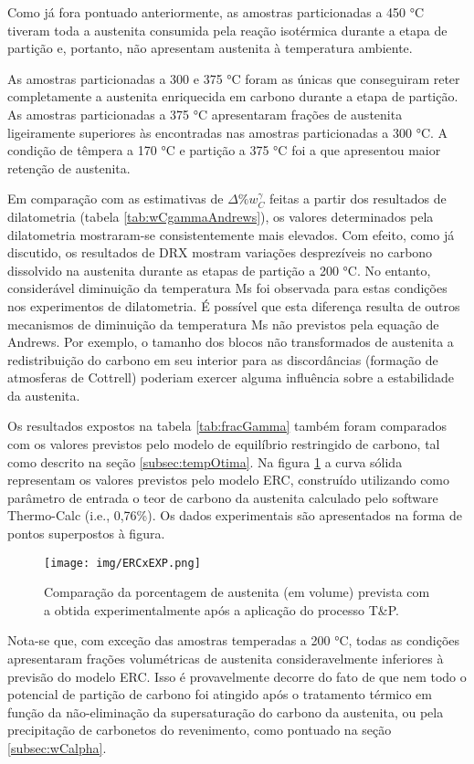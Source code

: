 Como já fora pontuado anteriormente, as amostras particionadas a 450 °C tiveram toda a austenita consumida pela reação isotérmica durante a etapa de partição e, portanto, não apresentam austenita à temperatura ambiente.

As amostras particionadas a 300 e 375 °C foram as únicas que conseguiram reter completamente a austenita enriquecida em carbono durante a etapa de partição. As amostras particionadas a 375 °C apresentaram frações de austenita ligeiramente superiores às encontradas nas amostras particionadas a 300 °C. A condição de têmpera a 170 °C e partição a 375 °C foi a que apresentou maior retenção de austenita.

Em comparação com as estimativas de $\Delta \%w_C^\gamma$ feitas a partir dos resultados de dilatometria (tabela \ref{tab:wCgammaAndrews}), os valores determinados pela dilatometria mostraram-se consistentemente mais elevados. Com efeito, como já discutido, os resultados de DRX mostram variações desprezíveis no carbono dissolvido na austenita durante as etapas de partição a 200 °C. No entanto, considerável diminuição da temperatura Ms foi observada para estas condições nos experimentos de dilatometria. É possível que esta diferença resulta de outros mecanismos de diminuição da temperatura Ms não previstos pela equação de Andrews. Por exemplo, o tamanho dos blocos não transformados de austenita a redistribuição do carbono em seu interior para as discordâncias (formação de atmosferas de Cottrell) poderiam exercer alguma influência sobre a estabilidade da austenita.

Os resultados expostos na tabela \ref{tab:fracGamma} também foram comparados com os valores previstos pelo modelo de equilíbrio restringido de carbono, tal como descrito na seção \ref{subsec:tempOtima}. Na figura \ref{fig:ERCxEXP} a curva sólida representam os valores previstos pelo modelo ERC, construído utilizando como parâmetro de entrada o teor de carbono da austenita calculado pelo software Thermo-Calc\textregistered{} (i.e., 0,76\%). Os dados experimentais são apresentados na forma de pontos superpostos à figura.

\begin{figure}
	\texttt{[image: img/ERCxEXP.png]}
	\caption{Comparação da porcentagem de austenita (em volume) prevista com a obtida experimentalmente após a aplicação do processo T\&P.}
	\label{fig:ERCxEXP}
\end{figure}

Nota-se que, com exceção das amostras temperadas a 200 °C, todas as condições apresentaram frações volumétricas de austenita consideravelmente inferiores à previsão do modelo ERC. Isso é provavelmente decorre do fato de que nem todo o potencial de partição de carbono foi atingido após o tratamento térmico em função da não-eliminação da supersaturação do carbono da austenita, ou pela precipitação de carbonetos do revenimento, como pontuado na seção \ref{subsec:wCalpha}.